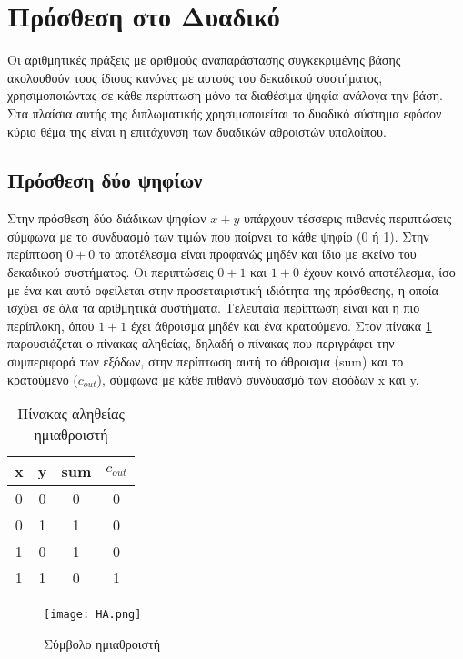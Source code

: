 

\section{Πρόσθεση στο Δυαδικό}
Οι αριθμητικές πράξεις με αριθμούς αναπαράστασης συγκεκριμένης βάσης ακολουθούν τους ίδιους κανόνες
με αυτούς του δεκαδικού συστήματος, χρησιμοποιώντας σε κάθε περίπτωση μόνο τα διαθέσιμα ψηφία ανάλογα την βάση. Στα πλαίσια αυτής της διπλωματικής χρησιμοποιείται το δυαδικό σύστημα εφόσον κύριο θέμα 
της είναι η επιτάχυνση των δυαδικών αθροιστών υπολοίπου.





\subsection{Πρόσθεση δύο ψηφίων}
Στην πρόσθεση δύο διάδικων ψηφίων $x+y$ υπάρχουν τέσσερις πιθανές περιπτώσεις σύμφωνα με το συνδυασμό
των τιμών που παίρνει το κάθε ψηφίο (0 ή 1). Στην περίπτωση $0+0$ το αποτέλεσμα είναι προφανώς μηδέν 
και ίδιο με εκείνο του δεκαδικού συστήματος. Οι περιπτώσεις $0+1$ και $1+0$ έχουν κοινό αποτέλεσμα, 
ίσο με ένα και αυτό οφείλεται στην προσεταιριστική ιδιότητα της πρόσθεσης, η οποία ισχύει σε όλα
τα αριθμητικά συστήματα. Τελευταία περίπτωση είναι και η πιο περίπλοκη, όπου $1+1$ έχει άθροισμα μηδέν
και ένα κρατούμενο. Στον πίνακα \ref{tb:HA_truth_table} παρουσιάζεται ο πίνακας αληθείας, δηλαδή ο 
πίνακας που περιγράφει την συμπεριφορά των εξόδων, στην περίπτωση αυτή το άθροισμα (sum) και το 
κρατούμενο ($c_{out}$), σύμφωνα με κάθε πιθανό συνδυασμό των εισόδων x και y.


\begin{multicols}{2}
\hfill
\begin{table}[H]
\centering
 \begin{tabular}{||c c | c c||} 
 \hline
 x & y & sum & $c_{out}$ \\ [0.5ex] 
 \hline\hline
 0 & 0 & 0 & 0 \\ 
 \hline
 0 & 1 & 1 & 0 \\
 \hline
 1 & 0 & 1 & 0 \\
 \hline
 1 & 1 & 0 & 1 \\
 \hline
\end{tabular}
\caption{Πίνακας αληθείας ημιαθροιστή}
 \label{tb:HA_truth_table}
\end{table}


\begin{figure}[H]
\centering
\texttt{[image: HA.png]}
\caption{Σύμβολο ημιαθροιστή}
\label{HASchematic}
\end{figure}

\end{multicols}

